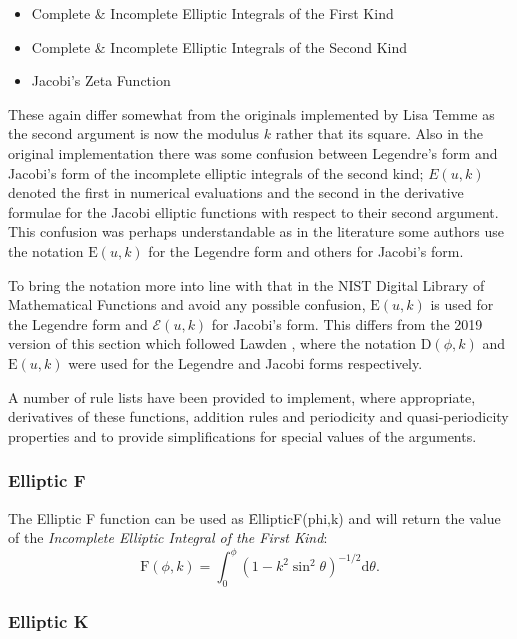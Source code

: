 \begin{itemize}
\item Complete \& Incomplete Elliptic Integrals of the First Kind
\item Complete \& Incomplete Elliptic Integrals of the Second Kind
\item Jacobi's Zeta Function
\end{itemize}

These again differ somewhat from the originals implemented by Lisa Temme
as the second argument is now the modulus $k$ rather that its square.
Also in the original implementation  there was some confusion between
Legendre's form and Jacobi's form of the incomplete elliptic integrals of
the second kind; $E(u,k)$ denoted the first in numerical
evaluations and the second in the derivative formulae for the Jacobi
elliptic functions with respect to their second argument.
This confusion was perhaps understandable
as in the literature some authors use the notation $\mathrm{E}(u, k)$ for
the Legendre form and others for Jacobi's form.

To bring the notation more into line with that in the NIST Digital Library of
Mathematical Functions and avoid any possible confusion, $\mathrm{E}(u, k)$ is used for
the Legendre form and $\mathcal{E}(u, k)$ for Jacobi's form.
This differs from the 2019 version of this section which followed Lawden \cite{Lawden:89},
where the notation $\mathrm{D}(\phi, k)$  and $\mathrm{E}(u, k)$ were used for the
Legendre and Jacobi forms respectively.

A number of rule lists have been provided to implement, where appropriate,
derivatives of these functions, addition rules and periodicity and
quasi-periodicity properties and to provide simplifications for special values
of the arguments.

\subsubsection{Elliptic F}
\hypertarget{operator:ELLIPTICF}{}

The Elliptic F function can be used as \f{EllipticF(phi,k)} and
will return the value of the \emph{Incomplete Elliptic Integral of the
First Kind}:
\[\mathrm{F}(\phi, k)=\int_0^\phi(1-k^2 \sin^2 \theta)^{-1/2} \mathrm{d}\theta.\]

\subsubsection{Elliptic K}
\hypertarget{operator:ELLIPTICK}{}
\hypertarget{operator:ELLIPTICK'}{}


